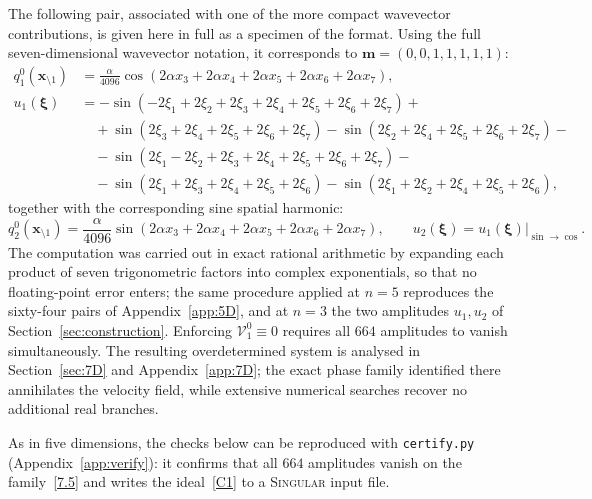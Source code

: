 \documentclass[11pt]{jfm}
\numberwithin{equation}{section}
\begin{document}
\medskip
\noindent The following pair, associated with one of the more compact wavevector contributions, is given here in full as a specimen of the format. Using the full seven-dimensional wavevector notation, it corresponds to $\boldsymbol{m}=(0,0,1,1,1,1,1)$:
\begin{subequations}
\label{Cs1}
\begin{align}
q_1^0(\boldsymbol{x}_{\setminus 1}) &= \frac{\alpha}{4096}
\cos\!\left(2\alpha x_3 + 2\alpha x_4 + 2\alpha x_5 + 2\alpha x_6 + 2\alpha x_7\right),
\label{Cs1a}\\
u_1(\boldsymbol{\xi}) &=
-\sin(-2\xi_1 + 2\xi_2 + 2\xi_3 + 2\xi_4 + 2\xi_5 + 2\xi_6 + 2\xi_7)+ \nonumber\\
&\quad + \sin(2\xi_3 + 2\xi_4 + 2\xi_5 + 2\xi_6 + 2\xi_7) - \sin(2\xi_2 + 2\xi_4 + 2\xi_5 + 2\xi_6 + 2\xi_7)- \nonumber\\
&\quad - \sin(2\xi_1 - 2\xi_2 + 2\xi_3 + 2\xi_4 + 2\xi_5 + 2\xi_6 + 2\xi_7)- \nonumber\\
&\quad - \sin(2\xi_1 + 2\xi_3 + 2\xi_4 + 2\xi_5 + 2\xi_6) - \sin(2\xi_1 + 2\xi_2 + 2\xi_4 + 2\xi_5 + 2\xi_6), \label{Cs1b}
\end{align}
\end{subequations}
together with the corresponding sine spatial harmonic:
\begin{equation}
\label{Cs2}
q_2^0(\boldsymbol{x}_{\setminus 1}) = \frac{\alpha}{4096}
\sin\!\left(2\alpha x_3 + 2\alpha x_4 + 2\alpha x_5 + 2\alpha x_6 + 2\alpha x_7\right),
\qquad
u_2(\boldsymbol{\xi}) = u_1(\boldsymbol{\xi})\big|_{\sin\to\cos}.
\end{equation}
The computation was carried out in exact rational arithmetic by expanding each product of seven
trigonometric factors into complex exponentials, so that no floating-point error enters; the
same procedure applied at $n=5$ reproduces the sixty-four pairs of Appendix~\ref{app:5D}, and at
$n=3$ the two amplitudes $u_1,u_2$ of Section~\ref{sec:construction}. Enforcing $\mathcal{V}_1^0\equiv0$ requires all $664$ amplitudes to vanish simultaneously. The resulting overdetermined system is analysed in Section~\ref{sec:7D} and Appendix~\ref{app:7D}; the exact phase family identified there annihilates the velocity field, while extensive numerical searches recover no additional real branches.

\noindent As in five dimensions, the checks below can be reproduced with \texttt{certify.py}
(Appendix~\ref{app:verify}): it confirms that all $664$ amplitudes vanish on the
family~\eqref{7.5} and writes the ideal~\eqref{C1} to a \textsc{Singular} input file.
\end{document}
